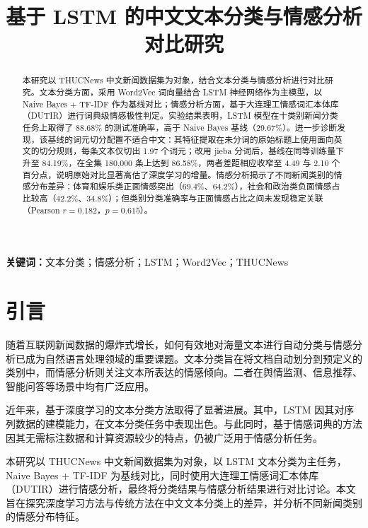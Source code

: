 \documentclass[12pt,a4paper]{article}
\begin{document}
\title{\textbf{基于 LSTM 的中文文本分类与情感分析对比研究}}
\author{}
\date{}
\maketitle
\thispagestyle{fancy}

\begin{abstract}
\setlength{\parindent}{2em}

本研究以 THUCNews 中文新闻数据集为对象，结合文本分类与情感分析进行对比研究。文本分类方面，采用 Word2Vec 词向量结合 LSTM 神经网络作为主模型，以 Naive Bayes + TF-IDF 作为基线对比；情感分析方面，基于大连理工情感词汇本体库（DUTIR）进行词典级情感极性判定。实验结果表明，LSTM 模型在十类别新闻分类任务上取得了 88.68\% 的测试准确率，高于 Naive Bayes 基线（29.67\%）。进一步诊断发现，该基线的词元切分配置不适合中文：其特征提取在未分词的原始标题上使用面向英文的切分规则，每条文本仅切出 1.97 个词元；改用 jieba 分词后，基线在同等训练量下升至 84.19\%，在全集 180{,}000 条上达到 86.58\%，两者差距相应收窄至 4.49 与 2.10 个百分点，说明原始对比显著高估了深度学习的增量。情感分析揭示了不同新闻类别的情感分布差异：体育和娱乐类正面情感突出（69.4\%、64.2\%），社会和政治类负面情感占比较高（42.2\%、34.8\%）；但类别分类准确率与正面情感占比之间未发现稳定关联（Pearson $r=0.182$，$p=0.615$）。

\end{abstract}

\begin{center}
\textbf{关键词：}文本分类；情感分析；LSTM；Word2Vec；THUCNews
\end{center}

\section{引言}

随着互联网新闻数据的爆炸式增长，如何有效地对海量文本进行自动分类与情感分析已成为自然语言处理领域的重要课题。文本分类旨在将文档自动划分到预定义的类别中，而情感分析则关注文本所表达的情感倾向。二者在舆情监测、信息推荐、智能问答等场景中均有广泛应用。

近年来，基于深度学习的文本分类方法取得了显著进展。其中，LSTM 因其对序列数据的建模能力，在文本分类任务中表现出色。与此同时，基于情感词典的方法因其无需标注数据和计算资源较少的特点，仍被广泛用于情感分析任务。

本研究以 THUCNews 中文新闻数据集为对象，以 LSTM 文本分类为主任务，Naive Bayes + TF-IDF 为基线对比，同时使用大连理工情感词汇本体库（DUTIR）进行情感分析，最终将分类结果与情感分析结果进行对比讨论。本文旨在探究深度学习方法与传统方法在中文文本分类上的差异，并分析不同新闻类别的情感分布特征。
\end{document}
